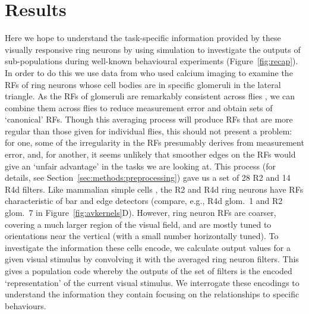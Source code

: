 \section{Results}
Here we hope to understand the task-specific information provided by these visually responsive ring neurons by using simulation to investigate the outputs of sub-populations during well-known behavioural experiments (Figure~\ref{fig:recap}). In order to do this we use data from  who used calcium imaging to examine the \acp{RF} of ring neurons whose cell bodies are in specific glomeruli in the lateral triangle. As the RFs of glomeruli are remarkably consistent across flies \cite{Seelig2013}, we can combine them across flies to reduce measurement error and obtain sets of `canonical' RFs. Though this averaging process will produce \acp{RF} that are more regular than those given for individual flies, this should not present a problem: for one, some of the irregularity in the \acp{RF} presumably derives from measurement error, and, for another, it seems unlikely that smoother edges on the \acp{RF} would give an `unfair advantage' in the tasks we are looking at. This process (for details, see Section~\ref{sec:methods:preprocessing}) gave us a set of 28 R2 and 14 R4d filters. Like mammalian simple cells \cite{Hubel1962,Wystrach2014}, the R2 and R4d ring neurons have RFs characteristic of bar and edge detectors (compare, e.g., R4d glom.~1 and R2 glom.~7 in Figure~\ref{fig:avkernels}D).
However, ring neuron RFs are coarser, covering a much larger region of the visual field, and are mostly tuned to orientations near the vertical (with a small number horizontally tuned). To investigate the information these cells encode, we calculate output values for a given visual stimulus by convolving it with the averaged ring neuron filters. This gives a population code whereby the outputs of the set of filters is the encoded `representation' of the current visual stimulus. We interrogate these encodings to understand the information they contain focusing on the relationships to specific behaviours.

